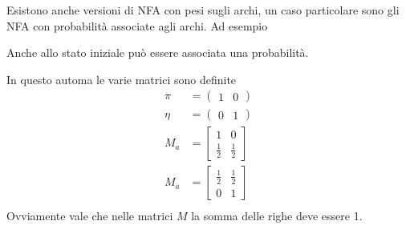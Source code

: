 \documentclass[12pt]{article}
\begin{document}
Esistono anche versioni di NFA con pesi sugli archi, un caso particolare sono gli NFA con probabilità associate agli archi.
Ad esempio
\begin{center}
\end{center}
Anche allo stato iniziale può essere associata una probabilità.

In questo automa le varie matrici sono definite
\begin{align*}
	\pi  &= \begin{pmatrix} 1 & 0 \end{pmatrix} \\
	\eta &= \begin{pmatrix} 0 & 1 \end{pmatrix} \\
	M_a  &= \begin{bmatrix} 1 & 0 \\ \frac{1}{2} & \frac{1}{2} \end{bmatrix} \\
	M_a  &= \begin{bmatrix} \frac{1}{2} & \frac{1}{2} \\ 0 & 1 \end{bmatrix} \\
\end{align*}
Ovviamente vale che nelle matrici $M$ la somma delle righe deve essere 1.
\end{document}
